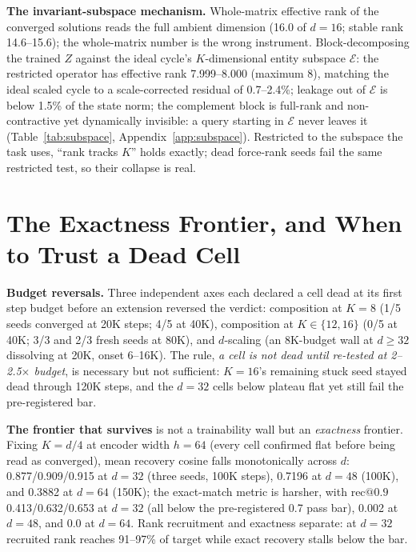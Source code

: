 \documentclass[mlabstract,onecolumn]{jmlr}
\makeatletter
\newcommand{\recninety}{\mathrm{rec}@0.9}
\makeatother
\begin{document}
\textbf{The invariant-subspace mechanism.} Whole-matrix effective rank
of the converged solutions reads the full ambient dimension (16.0 of
$d{=}16$; stable rank 14.6--15.6); the whole-matrix number is the wrong
instrument.
Block-decomposing the trained $Z$ against the ideal cycle's
$K$-dimensional entity subspace $\mathcal{E}$: the restricted operator
has effective rank 7.999--8.000 (maximum 8), matching the ideal scaled
cycle to a scale-corrected residual of 0.7--2.4\%; leakage out of
$\mathcal{E}$ is below 1.5\% of the state norm; the complement block is
full-rank and non-contractive yet dynamically invisible: a query
starting in $\mathcal{E}$ never leaves it (Table~\ref{tab:subspace},
Appendix~\ref{app:subspace}).
Restricted to the subspace the task uses, ``rank tracks $K$'' holds
exactly; dead force-rank seeds fail the same restricted test, so their
collapse is real.

\section{The Exactness Frontier, and When to Trust a Dead Cell}
\label{sec:frontier}

\textbf{Budget reversals.} Three independent axes each declared a cell
dead at its first step budget before an extension reversed the verdict:
composition at $K{=}8$ (1/5 seeds converged at 20K steps; 4/5 at 40K),
composition at $K \in \{12, 16\}$ (0/5 at 40K; 3/3 and 2/3 fresh seeds
at 80K),
and $d$-scaling (an 8K-budget wall at $d \geq 32$ dissolving at 20K,
onset 6--16K).
The rule, \emph{a cell is not dead until re-tested at 2--2.5$\times$
budget},
is necessary but not sufficient: $K{=}16$'s remaining stuck
seed stayed dead through 120K steps,
and the $d{=}32$ cells below plateau flat yet still fail the
pre-registered bar.

\textbf{The frontier that survives} is not a trainability wall but an
\emph{exactness} frontier. Fixing $K = d/4$ at encoder width $h = 64$
(every cell confirmed flat before being read as converged), mean
recovery cosine falls monotonically across $d$:
0.877/0.909/0.915 at $d{=}32$ (three
seeds, 100K steps), 0.7196 at $d{=}48$ (100K), and 0.3882 at $d{=}64$
(150K); the exact-match metric is harsher, with $\recninety$
0.413/0.632/0.653 at $d{=}32$ (all below the pre-registered 0.7 pass
bar), 0.002 at $d{=}48$, and 0.0 at $d{=}64$.
Rank recruitment and exactness separate: at $d{=}32$ recruited rank
reaches 91--97\% of target while exact recovery stalls below the bar.
\end{document}
